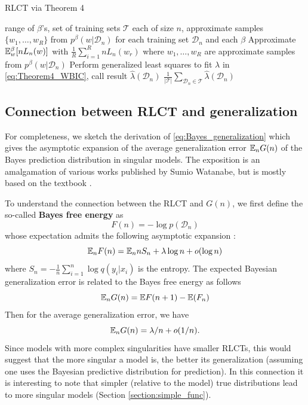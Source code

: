 \documentclass{article} %
\begin{document}
\begin{algorithm}[tb]
	\caption{RLCT via Theorem 4}
	\label{alg:thm4}
	\begin{algorithmic}
		 range of $\beta$'s, set of training sets $\mathcal T$ each of size $n$, approximate samples $\{w_1,\ldots,w_R\}$ from $p^\beta(w|\mathcal D_n)$ for each training set $\mathcal D_n$ and each $\beta$
        		\STATE Approximate ${\mathbb{E}}_w^\beta [nL_n(w)]$ with $\frac{1}{R} \sum_{i=1}^R nL_n(w_r)$ where $w_1,\ldots,w_R$ are approximate samples from $p^\beta(w|\mathcal D_n)$
    		\ENDFOR
    		\STATE Perform generalized least squares to fit $\lambda$ in \eqref{eq:Theorem4_WBIC}, call result $\hat \lambda(\mathcal D_n)$
		\ENDFOR
		 $\frac{1}{|\mathcal T|} \sum_{\mathcal D_n \in \mathcal T} \hat \lambda(\mathcal D_n)$
	\end{algorithmic}
\end{algorithm}



\subsection{Connection between RLCT and generalization} \label{appendix:generalization_theory}
For completeness, we sketch the derivation of \eqref{eq:Bayes_generalization} which gives the asymptotic expansion of the average generalization error ${\mathbb{E}}_n G(n)$ of the Bayes prediction distribution  in singular models. The exposition is an amalgamation of various works published by Sumio Watanabe, but is mostly based on the textbook \cite{watanabe_algebraic_2009}. 

To understand the connection between the RLCT and $G(n)$, we first define the so-called \textbf{Bayes free energy} as 
\[
F(n) = -\log p(\mathcal D_n)
\]
whose expectation admits the following asymptotic expansion \cite{watanabe_algebraic_2009}:
\[
{\mathbb{E}}_n F(n) =  {\mathbb{E}}_n n S_n + \lambda \log n + o(\log n)
\]
where $S_n = -\frac{1}{n} \sum_{i=1}^n \log q(y_i|x_i)$ is the entropy. 
The expected Bayesian generalization error is related to the Bayes free energy as follows
\[
{\mathbb{E}}_n G(n) = \mathbb{E} F(n+1) - \mathbb{E}(F_n)
\]
Then for the average generalization error, we have
\begin{equation}
{\mathbb{E}}_n G(n) = \lambda/n + o(1/n).
\label{eq:bayesgenerr}
\end{equation}
Since models with more complex singularities have smaller RLCTs, this would suggest that the more singular a model is, the better its generalization (assuming one uses the Bayesian predictive distribution for prediction). In this connection it is interesting to note that simpler (relative to the model) true distributions lead to more singular models (Section \ref{section:simple_func}).
\end{document}
